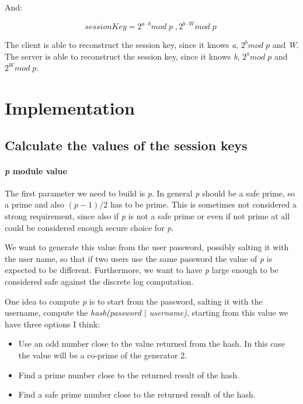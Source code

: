 \documentclass{article}
\begin{document}
\noindent And:

\begin{equation}
	sessionKey = 2^{a \cdot b} mod \;  p \; , 2^{b \cdot W} mod \;  p \;
\end{equation}

The client is able to reconstruct the session key, since it knows \emph{a}, $2^b mod  \; p$ and \emph{W}.
The server is able to reconstruct the session key, since it knows \emph{b}, $2^a mod  \; p$ and $2^W mod  \; p$. 

\section{Implementation}

\subsection{Calculate the values of the session keys}

\paragraph{\emph{p} module value}

The first parameter we need to build is \emph{p}.
In general \emph{p} should be a safe prime, so a prime and also $(p-1)/2$ has to be prime.
This is sometimes not considered a strong requirement, since also if \emph{p}
is not a safe prime or even if not prime at all could be considered enough secure choice for \emph{p}.

We want to generate this value from the user password, possibly salting it with the user name,
so that if two users use the same password the value of \emph{p} is expected to be different.
Furthermore, we want to have \emph{p} large enough to be considered safe against the discrete
log computation.

One idea to compute \emph{p} is to start from the password, salting it with the username, compute
the \emph{hash(password $\vert$ username)}, starting from this value we have three options I think:

 \begin{itemize}
	\item Use an odd number close to the value returned from the hash. In this case the value will be a co-prime of the generator 2.
	\item Find a prime number close to the returned result of the hash.
	\item Find a safe prime number close to the returned result of the hash.
\end{itemize}
\end{document}
